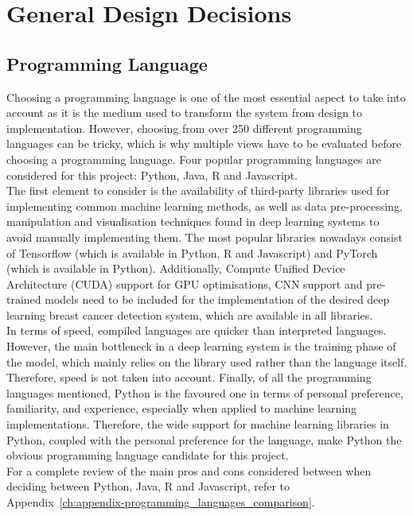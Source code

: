 \section{General Design Decisions}

\subsection{Programming Language}

Choosing a programming language is one of the most essential aspect to take into account as it is the medium used to transform the system from design to implementation. However, choosing from over 250 different programming languages \cite{tiobe} can be tricky, which is why multiple views have to be evaluated before choosing a programming language. Four popular programming languages are considered for this project: Python, Java, R and  Javascript.\\

The first element to consider is the availability of third-party libraries used for implementing common machine learning methods, as well as data pre-processing, manipulation and visualisation techniques found in deep learning systems to avoid manually implementing them. The most popular libraries nowadays consist of Tensorflow (which is available in Python, R and Javascript) and PyTorch (which is available in Python). Additionally, Compute Unified Device Architecture (CUDA) support for GPU optimisations, CNN support and pre-trained models need to be included for the implementation of the desired deep learning breast cancer detection system, which are available in all libraries.\\

In terms of speed, compiled languages are quicker than interpreted languages. However, the main bottleneck in a deep learning system is the training phase of the model, which mainly relies on the library used rather than the language itself. Therefore, speed is not taken into account. Finally, of all the programming languages mentioned, Python is the favoured one in terms of personal preference, familiarity, and experience, especially when applied to machine learning implementations. Therefore, the wide support for machine learning libraries in Python, coupled with the personal preference for the language, make Python the obvious programming language candidate for this project.\\

For a complete review of the main pros and cons considered between when deciding between Python, Java, R and Javascript, refer to Appendix~\ref{ch:appendix-programming_languages_comparison}.

